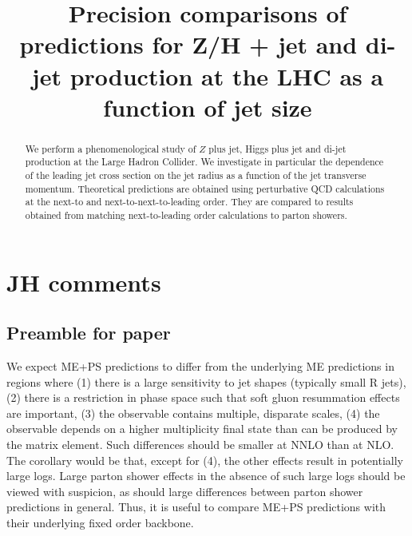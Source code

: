 \documentclass[aps,prd,onecolumn,fleqn,superscriptaddress,groupedaddress,nofootinbib,preprintnumbers,nobalancelastpage]{revtex4}
\begin{document}
\title{Precision comparisons of predictions for Z/H + jet
and di-jet production at the LHC as a function of jet size}

  
\begin{abstract}
  We perform a phenomenological study of
  $Z$ plus jet, Higgs plus jet and di-jet production
  at the Large Hadron Collider. We investigate in particular
  the dependence of the leading jet cross section on the
  jet radius as a function of the jet transverse momentum. 
  Theoretical predictions are obtained using perturbative QCD
  calculations at the next-to and next-to-next-to-leading order.
  They are compared to results obtained from matching 
  next-to-leading order calculations to parton showers.
\end{abstract}

\maketitle

\section{JH comments}

\subsection{Preamble for paper}

We expect ME+PS predictions to differ from the underlying ME predictions in regions where (1) there is a large sensitivity to jet shapes (typically small R jets), (2) there is a restriction in phase space such that soft gluon resummation effects are important, (3) the observable contains multiple, disparate  scales, (4) the observable depends on a higher multiplicity final state than can be produced by the matrix element. Such differences should be smaller at NNLO than at NLO. The corollary would be that, except for (4), the other effects result in 
potentially large logs. Large parton shower effects in the absence of such large logs should be viewed with suspicion, as should large differences between parton shower predictions in general. Thus, it is useful to compare ME+PS predictions with their underlying fixed order backbone. 
\end{document}
